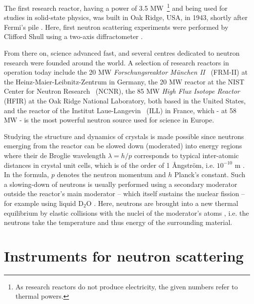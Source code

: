 The first research reactor, having a power of 3.5 MW~\footnote{As research reactors do not produce electricity,
the given numbers refer to thermal powers.} and being used for studies in solid-state physics, was built in
Oak Ridge, USA, in 1943, shortly after Fermi's pile \cite[p. 3]{Jacrot2021}.
Here, first neutron scattering experiments were performed by Clifford Shull using a two-axis diffractometer \cite[pp. 3, 37]{Jacrot2021}.

From there on, science advanced fast, and several centres dedicated to neutron research were founded around the world.
A selection of research reactors in operation today include the 20 MW \textit{Forschungsreaktor M\"unchen II}~\cite{web_mlz}
(FRM-II) at the Heinz-Maier-Leibnitz-Zentrum in Germany,
the 20 MW reactor at the NIST Center for Neutron Research~\cite{web_nist} (NCNR),
the 85 MW \textit{High Flux Isotope Reactor}~\cite{web_oakridge} (HFIR) at the Oak Ridge National Laboratory,
both based in the United States,
and the reactor of the Institut Laue-Langevin~\cite{web_ill} (ILL) in France, which - at 58 MW - is the most
powerful neutron source used for science in Europe.

Studying the structure and dynamics of crystals is made possible since neutrons emerging from the reactor can be
slowed down (moderated) into energy regions where their de Broglie wavelength $\lambda = h/p$ \cite[p. 89]{Gross2012}
corresponds to typical inter-atomic distances in crystal unit cells, which is of the order of 1 \AA{}ngstr\"om,
i.e. $10^{-10}$ m \cite[pp.1,3]{Squires2012}. In the formula, $p$ denotes the neutron momentum and $h$ Planck's constant.
Such a slowing-down of neutrons is usually performed using a secondary moderator outside the reactor's main moderator --
which itself sustains the nuclear fission -- for example using liquid $\mathrm{D_2O}$ \cite[p. 82]{Jacrot2021}.
Here, neutrons are brought into a new thermal equilibrium by elastic collisions with the nuclei of the moderator's
atoms \cite[p. 30]{Stacey2007}, i.e. the neutrons take the temperature and thus energy of the surrounding material.



\section{Instruments for neutron scattering \label{sec:instruments}}

